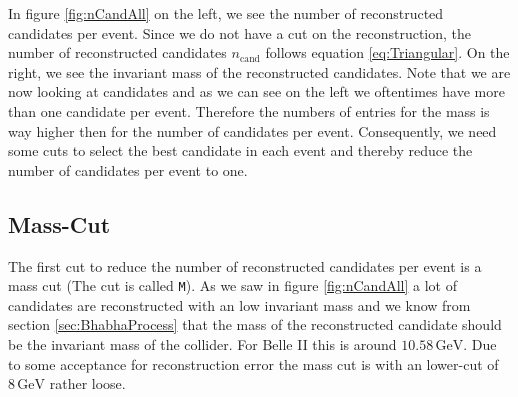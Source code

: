 \documentclass[a4paper,11pt,twosided,final,german,openbib,pdftex,listof=totoc,bibliography=totoc]{scrbook}
\begin{document}
In figure \ref{fig:nCandAll} on the left, we see the number of reconstructed candidates per event. Since we do not have a cut on the reconstruction, the number of reconstructed candidates $n_{\textrm{cand}}$ follows equation \ref{eq:Triangular}. On the right, we see the invariant mass of the reconstructed candidates. Note that we are now looking at candidates and as we can see on the left we oftentimes have more than one candidate per event. Therefore the numbers of entries for the mass is way higher then for the number of candidates per event.
Consequently, we need some cuts to select the best candidate in each event and thereby reduce the number of candidates per event to one.


\subsection{Mass-Cut}

The first cut to reduce the number of reconstructed candidates per event is a mass cut (The cut is called \texttt{M}). As we saw in figure \ref{fig:nCandAll} a lot of candidates are reconstructed with an low invariant mass and we know from section \ref{sec:BhabhaProcess} that the mass of the reconstructed candidate should be the invariant mass of the collider. For Belle II this is around $10.58\,\textrm{GeV}$. Due to some acceptance for reconstruction error the mass cut is with an lower-cut of $8\,\textrm{GeV}$ rather loose.
\end{document}
